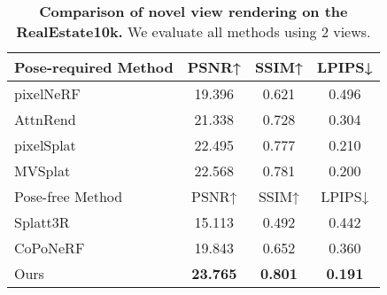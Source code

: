 \begin{table}%
\centering
\caption{\textbf{Comparison of novel view rendering on the RealEstate10k.} We evaluate all methods using 2 views.}
\vspace{-0.5em}
\small
\begin{tabular}{l|ccc}
\toprule
Pose-required Method & PSNR↑ & SSIM↑ & LPIPS↓ \\
\midrule
pixelNeRF & 19.396 & 0.621 & 0.496 \\
AttnRend & 21.338 & 0.728 & 0.304 \\
pixelSplat & 22.495 & 0.777 & 0.210 \\
MVSplat & 22.568 & 0.781 & 0.200 \\
\midrule
Pose-free Method & PSNR↑ & SSIM↑ & LPIPS↓ \\
\midrule
Splatt3R & 15.113 & 0.492 & 0.442 \\
CoPoNeRF & 19.843 & 0.652 & 0.360 \\
Ours & \textbf{23.765} & \textbf{0.801} & \textbf{0.191} \\
\bottomrule
\end{tabular}
\vspace{-1em}
\label{tab:nvs-realestate10k}
\end{table}